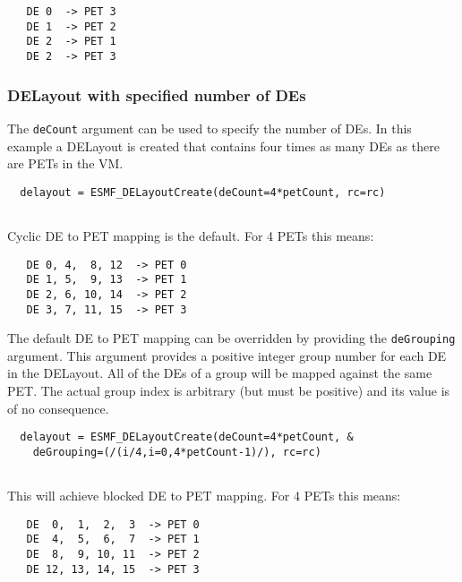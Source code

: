    \begin{verbatim}
   DE 0  -> PET 3
   DE 1  -> PET 2
   DE 2  -> PET 1
   DE 2  -> PET 3
   \end{verbatim} 

   \subsubsection{DELayout with specified number of DEs}
   
   The {\tt deCount} argument can be used to specify the number of DEs. In this
   example a DELayout is created that contains four times as many DEs as there 
   are PETs in the VM. 

 \begin{verbatim}
  delayout = ESMF_DELayoutCreate(deCount=4*petCount, rc=rc)
 
\end{verbatim}
 

   Cyclic DE to PET mapping is the default. For 4 PETs this means:
   \begin{verbatim}
   DE 0, 4,  8, 12  -> PET 0
   DE 1, 5,  9, 13  -> PET 1
   DE 2, 6, 10, 14  -> PET 2
   DE 3, 7, 11, 15  -> PET 3
   \end{verbatim}
   The default DE to PET mapping can be overridden by providing the
   {\tt deGrouping} argument. This argument provides a positive integer group 
   number for each DE in the DELayout. All of the DEs of a group will be mapped 
   against the same PET. The actual group index is arbitrary (but must be 
   positive) and its value is of no consequence. 

 \begin{verbatim}
  delayout = ESMF_DELayoutCreate(deCount=4*petCount, &
    deGrouping=(/(i/4,i=0,4*petCount-1)/), rc=rc)
 
\end{verbatim}
 

   This will achieve blocked DE to PET mapping. For 4 PETs this means:
   \begin{verbatim}
   DE  0,  1,  2,  3  -> PET 0
   DE  4,  5,  6,  7  -> PET 1
   DE  8,  9, 10, 11  -> PET 2
   DE 12, 13, 14, 15  -> PET 3
   \end{verbatim} 

